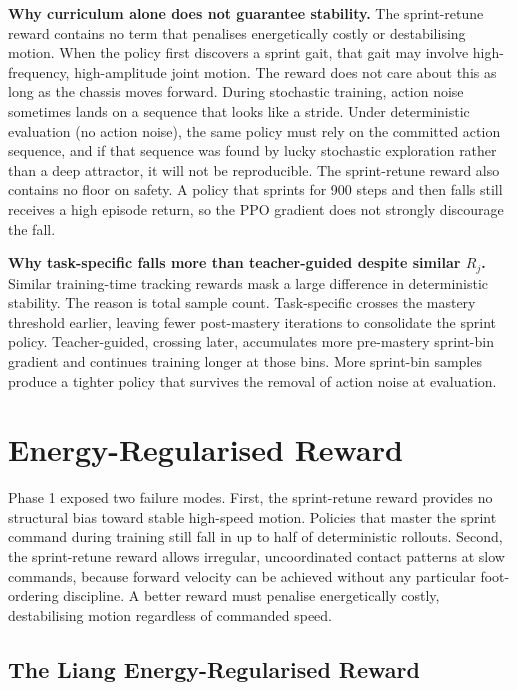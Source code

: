 \documentclass[a4paper,11pt]{article}
\begin{document}
    \textbf{Why curriculum alone does not guarantee stability.} The sprint-retune reward contains no term that penalises energetically costly or destabilising motion. When the policy first discovers a sprint gait, that gait may involve high-frequency, high-amplitude joint motion. The reward does not care about this as long as the chassis moves forward. During stochastic training, action noise sometimes lands on a sequence that looks like a stride. Under deterministic evaluation (no action noise), the same policy must rely on the committed action sequence, and if that sequence was found by lucky stochastic exploration rather than a deep attractor, it will not be reproducible. The sprint-retune reward also contains no floor on safety. A policy that sprints for 900 steps and then falls still receives a high episode return, so the PPO gradient does not strongly discourage the fall.

    \textbf{Why task-specific falls more than teacher-guided despite similar $R_j$.} Similar training-time tracking rewards mask a large difference in deterministic stability. The reason is total sample count. Task-specific crosses the mastery threshold earlier, leaving fewer post-mastery iterations to consolidate the sprint policy. Teacher-guided, crossing later, accumulates more pre-mastery sprint-bin gradient and continues training longer at those bins. More sprint-bin samples produce a tighter policy that survives the removal of action noise at evaluation.

    \section{Energy-Regularised Reward}

    Phase 1 exposed two failure modes. First, the sprint-retune reward provides no structural bias toward stable high-speed motion. Policies that master the sprint command during training still fall in up to half of deterministic rollouts. Second, the sprint-retune reward allows irregular, uncoordinated contact patterns at slow commands, because forward velocity can be achieved without any particular foot-ordering discipline. A better reward must penalise energetically costly, destabilising motion regardless of commanded speed.

    \subsection{The Liang Energy-Regularised Reward}
\end{document}
